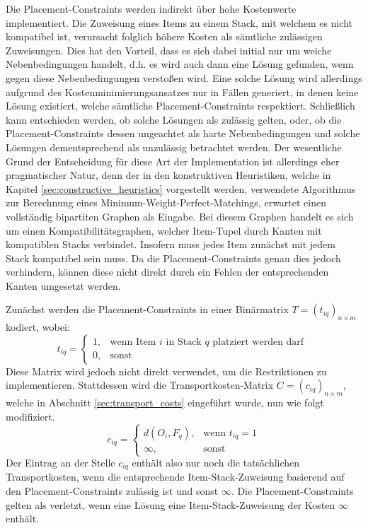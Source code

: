 Die Placement-Constraints werden indirekt über hohe Kostenwerte implementiert. Die Zuweisung eines Items zu einem
Stack, mit welchem es nicht kompatibel ist, verursacht folglich höhere Kosten als sämtliche zulässigen Zuweisungen.
Dies hat den Vorteil, dass es sich dabei initial nur um weiche Nebenbedingungen handelt,
d.h. es wird auch dann eine Lösung gefunden, wenn gegen diese Nebenbedingungen verstoßen wird.
Eine solche Lösung wird allerdings aufgrund des Kostenminimierungsansatzes nur in Fällen generiert,
in denen keine Lösung existiert, welche sämtliche Placement-Constraints respektiert.
Schließlich kann entschieden werden, ob solche Lösungen als zulässig gelten,
oder, ob die Placement-Constraints dessen ungeachtet als harte Nebenbedingungen und solche
Lösungen dementsprechend als unzulässig betrachtet werden.
Der wesentliche Grund der Entscheidung für diese Art der Implementation ist allerdings eher pragmatischer Natur, denn der in den konstruktiven Heuristiken, welche in Kapitel \ref{sec:constructive_heuristics} vorgestellt werden, verwendete Algorithmus zur Berechnung eines Minimum-Weight-Perfect-Matchings, erwartet einen vollständig bipartiten Graphen als Eingabe. Bei diesem Graphen handelt es sich um einen Kompatibilitätsgraphen, welcher Item-Tupel durch Kanten mit kompatiblen Stacks verbindet. Insofern muss jedes Item zunächst mit jedem Stack kompatibel sein muss. Da die Placement-Constraints genau dies jedoch verhindern, können diese nicht direkt durch ein Fehlen der entsprechenden Kanten umgesetzt werden.

\vfill
\pagebreak

Zunächst werden die Placement-Constraints in einer Binärmatrix $T = (t_{iq})_{n \times m}$ kodiert, wobei:
\[
    t_{iq} =
\begin{cases}
    1, & \text{wenn Item $i$ in Stack $q$ platziert werden darf }\\
    0, & \text{sonst}
\end{cases}
\]
Diese Matrix wird jedoch nicht direkt verwendet, um die Restriktionen zu implementieren. Stattdessen wird
die Transportkosten-Matrix $C = (c_{iq})_{n \times m}$, welche in Abschnitt \ref{sec:transport_costs} eingeführt wurde, nun wie folgt modifiziert.
\[
    c_{iq} =
\begin{cases}
    d(O_i, F_q), & \text{wenn $t_{iq} = 1$}\\
    \infty, & \text{sonst}
\end{cases}
\]
Der Eintrag an der Stelle $c_{iq}$ enthält also nur noch die tatsächlichen Transportkosten, wenn die
entsprechende Item-Stack-Zuweisung basierend auf den Placement-Constraints zulässig ist und sonst $\infty$.
Die Placement-Constraints gelten als verletzt, wenn eine Lösung eine Item-Stack-Zuweisung
der Kosten $\infty$ enthält.

